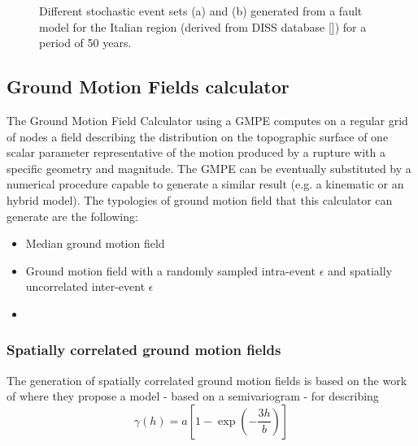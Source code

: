 \begin{figure}[!htbp]
\begin{center}
\caption{Different stochastic event sets (a) and (b) generated from a fault model for the Italian region (derived from DISS database [\cite{basili2008}]) for a period of 50 years.}
\label{ses_italy}
\end{center}
\end{figure}
%
\subsection{Ground Motion Fields calculator}
%
The Ground Motion Field Calculator using a GMPE computes on a regular grid of nodes a field  describing the distribution on the topographic surface of one scalar parameter representative of the motion produced by a rupture with a specific geometry and magnitude.
%
The GMPE can be eventually substituted by a numerical procedure capable to generate a similar result (e.g. a kinematic or an hybrid model). 
%
The typologies of ground motion field that this calculator can generate are the following:
\begin{itemize}
\item Median ground motion field
\item Ground motion field with a randomly sampled intra-event $\epsilon$ and spatially uncorrelated inter-event $\epsilon$
\item
\end{itemize}
%
\subsubsection{Spatially correlated ground motion fields}
The generation of spatially correlated ground motion fields is based on the work of \citet{jayaram2009} where they propose a model - based on a semivariogram - for describing 
\begin{equation}
\gamma(h) = a \left[1-\exp\left(-\frac{3h}{b}\right)\right]
\label{eq:jayaram_spat_corr}
\end{equation}
%
\clearpage\newpage
